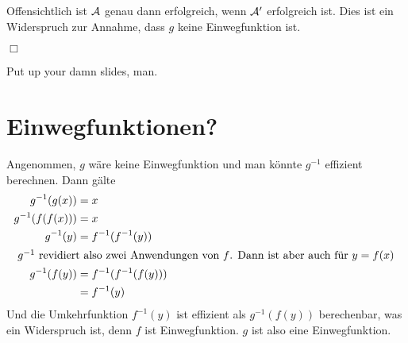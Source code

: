 \documentclass{../crypto}
\begin{document}
Offensichtlich ist $\mathcal{A}$ genau dann
erfolgreich, wenn $\mathcal{A}^\prime$ erfolgreich ist. Dies ist ein Widerspruch
zur Annahme, dass $g$ keine Einwegfunktion ist.

\hfill{}$\Box$



Put up your damn slides, man.

\section{Einwegfunktionen?}

Angenommen, $g$ wäre keine Einwegfunktion und man könnte $g^{-1}$ effizient
berechnen. Dann gälte 
\begin{align*}
   g^{-1}(g(x)) &= x \\
   g^{-1}(f(f(x))) &= x \\
   g^{-1}(y) &= f^{-1}(f^{-1}(y)) \\
   \intertext{
      $g^{-1}$ revidiert also zwei Anwendungen von $f$. Dann ist aber auch
      für $y=f(x)$
   }
   g^{-1}(f(y)) &= f^{-1}(f^{-1}(f(y))) \\
                &= f^{-1}(y)
\end{align*}
Und die Umkehrfunktion $f^{-1}(y)$ ist effizient als $g^{-1}(f(y))$ berechenbar,
was ein Widerspruch ist, denn $f$ ist Einwegfunktion. $g$ ist also eine
Einwegfunktion.
\end{document}
